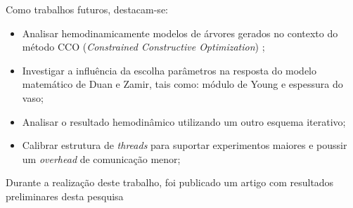 


Como trabalhos futuros, destacam-se:
\begin{itemize}
	\item Analisar hemodinamicamente modelos de árvores gerados no contexto do método CCO (\emph{Constrained Constructive Optimization}) \cite{Karch1999,Queiroz2013,Queiroz2015,Brito2017,Brito2021};
	\item Investigar a influência da escolha parâmetros na resposta do modelo matemático de Duan e Zamir, tais como: módulo de Young e espessura do vaso;
	\item Analisar o resultado hemodinâmico utilizando um outro esquema iterativo;
	\item Calibrar estrutura de \textit{threads} para suportar experimentos maiores e poussir um \textit{overhead} de comunicação menor;
\end{itemize}

Durante a realização deste trabalho, foi publicado um artigo com resultados preliminares desta pesquisa \cite{Pires20}